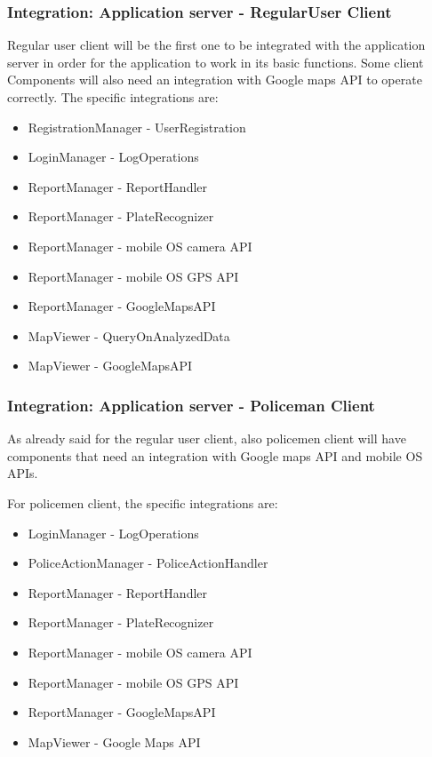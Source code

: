 \subsubsection{Integration: Application server - RegularUser Client}
Regular user client will be the first one to be integrated with the application server in order for the application to work in its basic functions.
Some client Components will also need an integration with Google maps API to operate correctly.
The specific integrations are:
\begin{itemize}
	\item RegistrationManager - UserRegistration
	\item LoginManager - LogOperations
	\item ReportManager - ReportHandler
	\item ReportManager - PlateRecognizer
	\item ReportManager - mobile OS camera API
	\item ReportManager - mobile OS GPS API
	\item ReportManager - GoogleMapsAPI
	\item MapViewer - QueryOnAnalyzedData
	\item MapViewer - GoogleMapsAPI
\end{itemize}

\subsubsection{Integration: Application server - Policeman Client}
As already said for the regular user client, also policemen client will have components that need an integration with Google maps API and mobile OS APIs. \\ \par
For policemen client, the specific integrations are:
\begin{itemize}
	\item LoginManager - LogOperations	
	\item PoliceActionManager - PoliceActionHandler
	\item ReportManager - ReportHandler
	\item ReportManager - PlateRecognizer
	\item ReportManager - mobile OS camera API
	\item ReportManager - mobile OS GPS API
	\item ReportManager - GoogleMapsAPI
	\item MapViewer - Google Maps API
\end{itemize}


